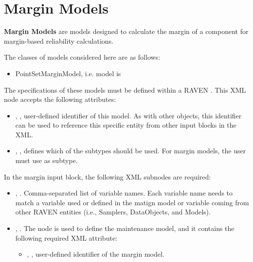 \section{Margin Models}
\label{sec:MarginModels}

\textbf{Margin Models} are models designed to calculate the margin of a component for margin-based reliability 
calculations.

The classes of models considered here are as follows:
\begin{itemize}
	\item PointSetMarginModel, i.e. model  is 
\end{itemize}

The specifications of these models must be defined within a RAVEN . This
XML node accepts the following attributes:
\begin{itemize}
	\item {}, , user-defined identifier of this model.
	\nb As with other objects, this identifier can be used to reference this specific entity from other
	input blocks in the XML.
	\item {}, , defines which of the subtypes should
	be used. For margin models, the user must use  as subtype.
\end{itemize}

In the margin  input block, the following XML subnodes are required:
\begin{itemize}
	\item {}, . Comma-separated list of variable
	names. Each variable name needs to match a variable used or defined in the matign model or variable
	coming from other RAVEN entities (i.e., Samplers, DataObjects, and Models).
	\item {}, . The node is used to define the maintenance
	model, and it contains the following required XML attribute:
	\begin{itemize}
		\item {}, , user-defined identifier of the margin model.
	\end{itemize}
\end{itemize}

